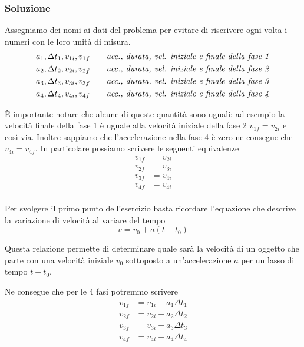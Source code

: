 \documentclass{article}
\begin{document}
\subsubsection{Soluzione}

Assegniamo dei nomi ai dati del problema per evitare di riscrivere ogni volta i numeri con le loro unità di misura. 
\begin{align}
  & a_1, \Delta t_1, v_{1i}, v_{1f} \qquad \text{\textit{acc., durata, vel. iniziale e finale della fase 1}} \\
  & a_2, \Delta t_2, v_{2i}, v_{2f} \qquad \text{\textit{acc., durata, vel. iniziale e finale della fase 2}} \\
  & a_3, \Delta t_3, v_{3i}, v_{3f} \qquad \text{\textit{acc., durata, vel. iniziale e finale della fase 3}} \\
  & a_4, \Delta t_4, v_{4i}, v_{4f} \qquad \text{\textit{acc., durata, vel. iniziale e finale della fase 4}}
\end{align}

È importante notare che alcune di queste quantità sono uguali: ad esempio la velocità finale della fase 1 è uguale alla velocità iniziale della fase 2 $v_{1f}=v_{2i}$ e così via. Inoltre sappiamo che l'accelerazione nella fase 4 è zero ne consegue che $v_{4i}=v_{4f}$.
In particolare possiamo scrivere le seguenti equivalenze
\begin{align}
  v_{1f} &= v_{2i} \\
  v_{2f} &= v_{3i} \\
  v_{3f} &= v_{4i} \\
  v_{4f} &= v_{4i} \\
\end{align}

Per svolgere il primo punto dell'esercizio basta ricordare l'equazione che descrive la variazione di velocità al variare del tempo
\begin{equation}
  v = v_0 + a (t-t_0)
\end{equation}

Questa relazione permette di determinare quale sarà la velocità di un oggetto che parte con una velocità iniziale $v_0$ sottoposto a un'accelerazione $a$ per un lasso di tempo $t-t_0$.

Ne consegue che per le 4 fasi potremmo scrivere
\begin{align}
  v_{1f} &= v_{1i} + a_1 \Delta t_1 \\
  v_{2f} &= v_{2i} + a_2 \Delta t_2 \\
  v_{3f} &= v_{3i} + a_3 \Delta t_3 \\
  v_{4f} &= v_{4i} + a_4 \Delta t_4
\end{align}
\end{document}
